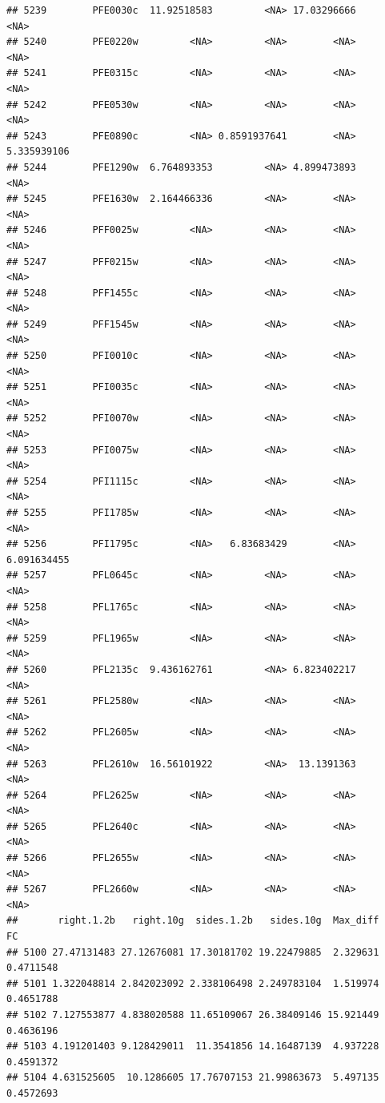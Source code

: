 \documentclass[12pt, a4paper]{article}\usepackage[]{graphicx}\usepackage[]{color}
\makeatletter
\newenvironment{kframe}{%
 \def\at@end@of@kframe{}%
 \ifinner\ifhmode%
  \def\at@end@of@kframe{\end{minipage}}%
  \begin{minipage}{\columnwidth}%
 \fi\fi%
 \def\FrameCommand##1{\hskip\@totalleftmargin \hskip-\fboxsep
 \colorbox{shadecolor}{##1}\hskip-\fboxsep
     \hskip-\linewidth \hskip-\@totalleftmargin \hskip\columnwidth}%
 \MakeFramed {\advance\hsize-\width
   \@totalleftmargin\z@ \linewidth\hsize
   \@setminipage}}%
 {\par\unskip\endMakeFramed%
 \at@end@of@kframe}
\newenvironment{knitrout}{}{} %
\makeatother
\begin{document}
\begin{knitrout}
\begin{kframe}
\begin{verbatim}
## 5239        PFE0030c  11.92518583         <NA> 17.03296666        <NA>
## 5240        PFE0220w         <NA>         <NA>        <NA>        <NA>
## 5241        PFE0315c         <NA>         <NA>        <NA>        <NA>
## 5242        PFE0530w         <NA>         <NA>        <NA>        <NA>
## 5243        PFE0890c         <NA> 0.8591937641        <NA> 5.335939106
## 5244        PFE1290w  6.764893353         <NA> 4.899473893        <NA>
## 5245        PFE1630w  2.164466336         <NA>        <NA>        <NA>
## 5246        PFF0025w         <NA>         <NA>        <NA>        <NA>
## 5247        PFF0215w         <NA>         <NA>        <NA>        <NA>
## 5248        PFF1455c         <NA>         <NA>        <NA>        <NA>
## 5249        PFF1545w         <NA>         <NA>        <NA>        <NA>
## 5250        PFI0010c         <NA>         <NA>        <NA>        <NA>
## 5251        PFI0035c         <NA>         <NA>        <NA>        <NA>
## 5252        PFI0070w         <NA>         <NA>        <NA>        <NA>
## 5253        PFI0075w         <NA>         <NA>        <NA>        <NA>
## 5254        PFI1115c         <NA>         <NA>        <NA>        <NA>
## 5255        PFI1785w         <NA>         <NA>        <NA>        <NA>
## 5256        PFI1795c         <NA>   6.83683429        <NA> 6.091634455
## 5257        PFL0645c         <NA>         <NA>        <NA>        <NA>
## 5258        PFL1765c         <NA>         <NA>        <NA>        <NA>
## 5259        PFL1965w         <NA>         <NA>        <NA>        <NA>
## 5260        PFL2135c  9.436162761         <NA> 6.823402217        <NA>
## 5261        PFL2580w         <NA>         <NA>        <NA>        <NA>
## 5262        PFL2605w         <NA>         <NA>        <NA>        <NA>
## 5263        PFL2610w  16.56101922         <NA>  13.1391363        <NA>
## 5264        PFL2625w         <NA>         <NA>        <NA>        <NA>
## 5265        PFL2640c         <NA>         <NA>        <NA>        <NA>
## 5266        PFL2655w         <NA>         <NA>        <NA>        <NA>
## 5267        PFL2660w         <NA>         <NA>        <NA>        <NA>
##       right.1.2b   right.10g  sides.1.2b   sides.10g  Max_diff        FC
## 5100 27.47131483 27.12676081 17.30181702 19.22479885  2.329631 0.4711548
## 5101 1.322048814 2.842023092 2.338106498 2.249783104  1.519974 0.4651788
## 5102 7.127553877 4.838020588 11.65109067 26.38409146 15.921449 0.4636196
## 5103 4.191201403 9.128429011  11.3541856 14.16487139  4.937228 0.4591372
## 5104 4.631525605  10.1286605 17.76707153 21.99863673  5.497135 0.4572693

\end{verbatim}
\end{kframe}
\end{knitrout}
\end{document}
